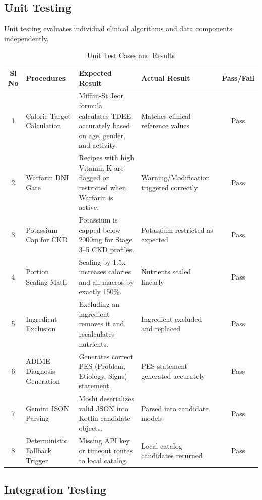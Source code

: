 \documentclass[a4paper,12pt]{report}
\begin{document}
\subsection{Unit Testing}

Unit testing evaluates individual clinical algorithms and data components independently.

\begin{table}[H]
\centering
\begin{tabular}{|c|p{3.2cm}|p{4.4cm}|p{4.4cm}|c|}
\hline
\textbf{Sl No} & \textbf{Procedures} & \textbf{Expected Result} & \textbf{Actual Result} & \textbf{Pass/Fail} \\
\hline \hline
1 & Calorie Target Calculation & Mifflin-St Jeor formula calculates TDEE accurately based on age, gender, and activity. & Matches clinical reference values & Pass \\
\hline
2 & Warfarin DNI Gate & Recipes with high Vitamin K are flagged or restricted when Warfarin is active. & Warning/Modification triggered correctly & Pass \\
\hline
3 & Potassium Cap for CKD & Potassium is capped below 2000mg for Stage 3--5 CKD profiles. & Potassium restricted as expected & Pass \\
\hline
4 & Portion Scaling Math & Scaling by 1.5x increases calories and all macros by exactly 150\%. & Nutrients scaled linearly & Pass \\
\hline
5 & Ingredient Exclusion & Excluding an ingredient removes it and recalculates nutrients. & Ingredient excluded and replaced & Pass \\
\hline
6 & ADIME Diagnosis Generation & Generates correct PES (Problem, Etiology, Signs) statement. & PES statement generated accurately & Pass \\
\hline
7 & Gemini JSON Parsing & Moshi deserializes valid JSON into Kotlin candidate objects. & Parsed into candidate models & Pass \\
\hline
8 & Deterministic Fallback Trigger & Missing API key or timeout routes to local catalog. & Local catalog candidates returned & Pass \\
\hline
\end{tabular}
\caption{Unit Test Cases and Results}
\end{table}

\subsection{Integration Testing}
\end{document}
